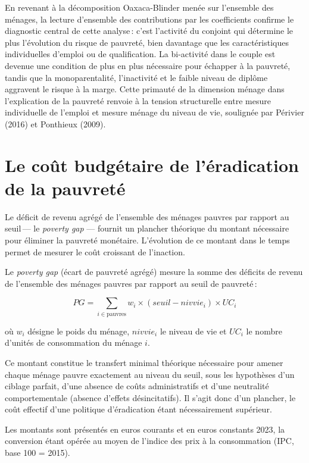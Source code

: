 \documentclass[
  french,
  9pt,
  a4paper,
]{article}
\begin{document}
En revenant à la décomposition Oaxaca-Blinder menée sur l'ensemble des
ménages, la lecture d'ensemble des contributions par les coefficients
confirme le diagnostic central de cette analyse\,: c'est l'activité du
conjoint qui détermine le plus l'évolution du risque de pauvreté, bien
davantage que les caractéristiques individuelles d'emploi ou de
qualification. La bi-activité dans le couple est devenue une condition
de plus en plus nécessaire pour échapper à la pauvreté, tandis que la
monoparentalité, l'inactivité et le faible niveau de diplôme aggravent
le risque à la marge. Cette primauté de la dimension ménage dans
l'explication de la pauvreté renvoie à la tension structurelle entre
mesure individuelle de l'emploi et mesure ménage du niveau de vie,
soulignée par Périvier (2016) et Ponthieux (2009).

\section{Le coût budgétaire de l'éradication de la
pauvreté}\label{le-couxfbt-budguxe9taire-de-luxe9radication-de-la-pauvretuxe9}

Le déficit de revenu agrégé de l'ensemble des ménages pauvres par
rapport au seuil\,--- le \emph{poverty gap} --- fournit un plancher
théorique du montant nécessaire pour éliminer la pauvreté monétaire.
L'évolution de ce montant dans le temps permet de mesurer le coût
croissant de l'inaction.

\begin{tcolorbox}[enhanced jigsaw, leftrule=.75mm, breakable, toptitle=1mm, toprule=.15mm, title={Encadré 5\,--- Estimation du \emph{poverty gap}}, opacityback=0, arc=.35mm, opacitybacktitle=0.6, colback=white, coltitle=black, colframe=quarto-callout-note-color-frame, left=2mm, colbacktitle=quarto-callout-note-color!10!white, bottomtitle=1mm, titlerule=0mm, rightrule=.15mm, bottomrule=.15mm]

Le \emph{poverty gap} (écart de pauvreté agrégé) mesure la somme des
déficits de revenu de l'ensemble des ménages pauvres par rapport au
seuil de pauvreté\,:

\[PG = \sum_{i \in \text{pauvres}} w_i \times (seuil - nivvie_i) \times UC_i\]

où \(w_i\) désigne le poids du ménage, \(nivvie_i\) le niveau de vie et
\(UC_i\) le nombre d'unités de consommation du ménage \(i\).

Ce montant constitue le transfert minimal théorique nécessaire pour
amener chaque ménage pauvre exactement au niveau du seuil, sous les
hypothèses d'un ciblage parfait, d'une absence de coûts administratifs
et d'une neutralité comportementale (absence d'effets désincitatifs). Il
s'agit donc d'un plancher, le coût effectif d'une politique
d'éradication étant nécessairement supérieur.

Les montants sont présentés en euros courants et en euros constants
2023, la conversion étant opérée au moyen de l'indice des prix à la
consommation (IPC, base 100 = 2015).

\end{tcolorbox}
\end{document}
